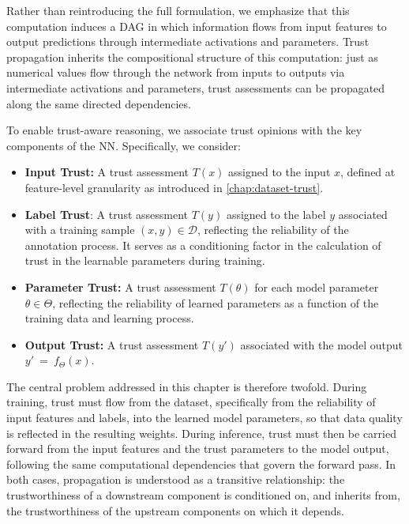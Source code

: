 Rather than reintroducing the full formulation, we emphasize that this computation induces a \ac{DAG} in which information flows from input features to output predictions through intermediate activations and parameters. Trust propagation inherits the compositional structure of this computation: just as numerical values flow through the network from inputs to outputs via intermediate activations and parameters, trust assessments can be propagated along the same directed dependencies.

To enable trust-aware reasoning, we associate trust opinions with the key components of the \ac{NN}. Specifically, we consider:
\begin{itemize}
    \item \textbf{Input Trust:} A trust assessment $T(x)$ assigned to the input $x$, defined at feature-level granularity as introduced in \cref{chap:dataset-trust}.

    \item \textbf{Label Trust}: A trust assessment $T(y)$  assigned to the label $y$ associated with a training sample $(x,y) \in \mathcal{D}$, reflecting the reliability of the annotation process. It serves as a conditioning factor in the calculation of trust in the learnable parameters during training.

    \item \textbf{Parameter Trust:} A trust assessment $T(\theta)$ for each model parameter $\theta \in \Theta$, reflecting the reliability of learned parameters as a function of the training data and learning process.

    \item \textbf{Output Trust:} A trust assessment $T(y')$ associated with the model output $y'~=~f_\Theta(x)$.
\end{itemize}

\noindent The central problem addressed in this chapter is therefore twofold. During training, trust must flow from the dataset, specifically from the reliability of input features and labels, into the learned model parameters, so that data quality is reflected in the resulting weights. During inference, trust must then be carried forward from the input features and the trust parameters to the model output, following the same computational dependencies that govern the forward pass. In both cases, propagation is understood as a transitive relationship: the trustworthiness of a downstream component is conditioned on, and inherits from, the trustworthiness of the upstream components on which it depends.


